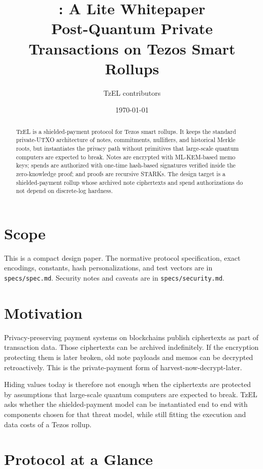 \documentclass[11pt]{article}
\title{\TzEL: A Lite Whitepaper\\
\large Post-Quantum Private Transactions on Tezos Smart Rollups}
\author{TzEL contributors}
\date{\today}
\newcommand{\TzEL}{TzEL}
\begin{document}
\maketitle

\begin{abstract}
\TzEL{} is a shielded-payment protocol for Tezos smart rollups. It keeps the
standard private-UTXO architecture of notes, commitments, nullifiers, and
historical Merkle roots, but instantiates the privacy path without primitives
that large-scale quantum computers are expected to break. Notes are encrypted
with ML-KEM-based memo keys; spends are authorized with one-time hash-based
signatures verified inside the zero-knowledge proof; and proofs are recursive
STARKs. The design target is a shielded-payment rollup whose archived note
ciphertexts and spend authorizations do not depend on discrete-log hardness.
\end{abstract}

\section{Scope}

This is a compact design paper. The normative protocol specification, exact
encodings, constants, hash personalizations, and test vectors are in
\texttt{specs/spec.md}. Security notes and caveats are in
\texttt{specs/security.md}.

\section{Motivation}

Privacy-preserving payment systems on blockchains publish ciphertexts as part
of transaction data. Those ciphertexts can be archived indefinitely. If the
encryption protecting them is later broken, old note payloads and memos can be
decrypted retroactively. This is the private-payment form of
harvest-now-decrypt-later.

Hiding values today is therefore not enough when the ciphertexts are protected
by assumptions that large-scale quantum computers are expected to break.
\TzEL{} asks whether the shielded-payment model can be instantiated end to end
with components chosen for that threat model, while still fitting the execution
and data costs of a Tezos rollup.

\section{Protocol at a Glance}
\end{document}
